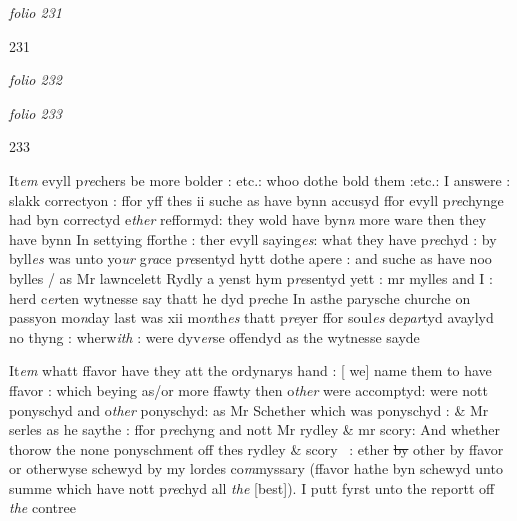 \documentclass[12pt, a4paper]{book}
\begin{document}
               
\dotfill
						\newpage
{}

\textit{folio 231}


\begin{flushright}{\color{Mahogany}231}\end{flushright}

\dotfill
						\newpage
{}

\textit{folio 232}


               \vspace*{4cm}
               
\dotfill
						

\textit{folio 233}


\begin{flushright}{\color{Mahogany}233}\end{flushright}

		\ifthenelse{\isodd{\thepage}}
		{\reversemarginpar}
		{\normalmarginpar}
		It\textit{em} evyll p\textit{re}chers be more bolder : etc.: whoo dothe bold them :etc.: I answere : slakk
correctyon : ffor yff thes ii suche as have bynn accusyd ffor evyll p\textit{re}chynge
had byn correctyd e\textit{ther} refformyd: they wold have byn\textit{n} more ware then 
they have bynn In settying fforthe : ther evyll saying\textit{es}: what they have
p\textit{re}chyd : by byll\textit{es} was unto yo\textit{ur} g\textit{ra}ce p\textit{re}sentyd hytt dothe apere : and
suche as have noo bylles / as Mr lawncelett Rydly a yenst hym p\textit{re}sentyd
yett : mr mylles and I : herd c\textit{er}ten wytnesse say thatt he dyd p\textit{re}che In
asthe parysche churche on passyon mo\textit{n}day last was xii mo\textit{n}th\textit{es} thatt
p\textit{re}yer ffor soul\textit{es} de\textit{par}tyd avaylyd no thyng : wherw\textit{ith} : were dyv\textit{er}se offendyd
as the wytnesse sayde

		\ifthenelse{\isodd{\thepage}}
		{\reversemarginpar}
		{\normalmarginpar}
		It\textit{em} whatt ffavor have they att the ordynarys hand : [ we] name them to have
ffavor : which beying as/or more
			 ffawty then
			 o\textit{ther} were accomptyd: were nott ponyschyd and o\textit{ther}
ponyschyd: as
			 Mr Schether which 
			was ponyschyd : \& Mr serles as he saythe : ffor p\textit{re}chyng
and nott
			 Mr rydley \& mr scory: And whether thorow  the none ponyschment off
	thes rydley \& scory 
			 : ether \sout{by  }other by
			 ffavor or
			 otherwyse schewyd by my lordes co\textit{m}myssary (ffavor
	hathe byn schewyd unto summe 
			which have nott p\textit{re}chyd all \textit{the }[best]). I putt
fyrst unto the reportt off \textit{the }contree
 	
\end{document}
